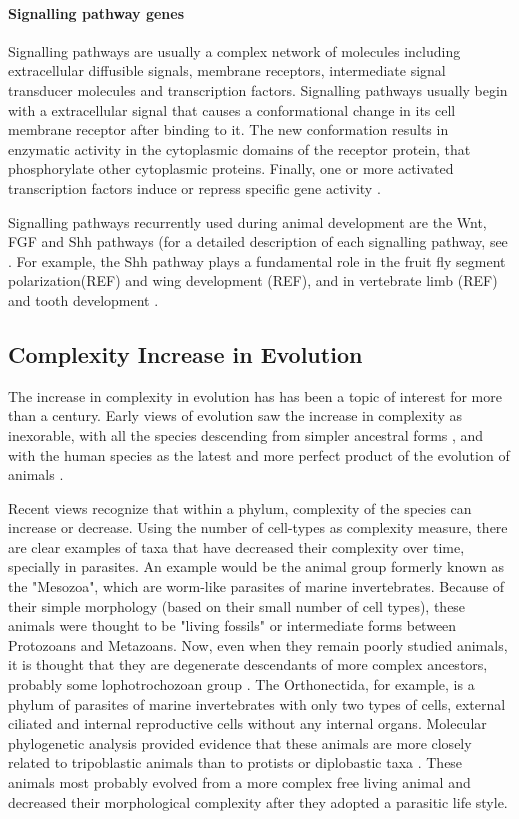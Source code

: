 \paragraph{Signalling pathway genes} Signalling pathways are usually a complex network of molecules including extracellular diffusible signals, membrane receptors, intermediate signal transducer molecules and transcription factors.
Signalling pathways usually begin with a extracellular signal that causes a conformational change in its cell membrane receptor after binding to it.
The new conformation results in enzymatic activity in the cytoplasmic domains of the receptor protein, that phosphorylate other cytoplasmic proteins.
Finally, one or more activated transcription factors induce or repress specific gene activity \citep{Gilbert2014}.

Signalling pathways recurrently used during animal development are the Wnt, FGF and Shh pathways (for a detailed description of each signalling pathway, see \citep{Gilbert2014}.
For example, the Shh pathway plays a fundamental role in the fruit fly segment polarization(REF) and wing development (REF), and in vertebrate limb (REF) and tooth development \citep{Jernvall2000b}.


\subsection{Complexity Increase in Evolution}

The increase in complexity in evolution has has been a topic of interest for more than a century.
Early views of evolution saw the increase in complexity as inexorable, with all the species descending from simpler ancestral forms \citep{lamarck1809zoo,haeckel1874menschen}, and with the human species as the latest and more perfect product of the evolution of animals \citep{haeckel1874menschen}.


Recent views recognize that within a phylum, complexity of the species can increase or decrease.
Using the number of cell-types as complexity measure, there are clear examples of taxa that have decreased their complexity over time, specially in parasites.
An example would be the animal group formerly known as the "Mesozoa", which are worm-like parasites of marine invertebrates.
Because of their simple morphology (based on their small number of cell types), these animals were thought to be "living fossils" or intermediate forms between Protozoans and Metazoans.
Now, even when they remain poorly studied animals, it is thought that they are degenerate descendants of more complex ancestors, probably some lophotrochozoan group \citep{Arthur2010}.
The Orthonectida, for example, is a phylum of parasites of marine invertebrates with only two types of cells, external ciliated and internal reproductive cells without any internal organs. 
Molecular phylogenetic analysis provided evidence that these animals are more closely related to tripoblastic animals than to protists or diplobastic taxa \citep{Hanelt1996}.
These animals most probably evolved from a more complex free living animal and decreased their morphological complexity after they adopted a parasitic life style.

